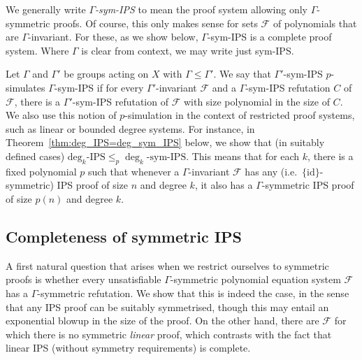 \documentclass[10pt,a4paper]{article}
\newcommand{\sIPS}{\mathrm{sym\text{-}IPS}}
\newcommand{\degKIPS}[1]{\mathrm{deg}_{#1}\mathrm{\text{-}IPS}}
\newcommand{\id}{\ensuremath{\mathrm{id}}}
\newcommand{\F}{\ensuremath{\mathcal{F}}}
\begin{document}
We generally write \emph{$\Gamma$-sym-IPS} to mean the proof system allowing only $\Gamma$-symmetric proofs.  Of course, this only makes sense for sets $\F$ of polynomials that are $\Gamma$-invariant.  For these, as we show below, $\Gamma$-sym-IPS is a complete proof system.  Where $\Gamma$ is clear from context, we may write just sym-IPS.

Let $\Gamma$ and $\Gamma'$ be groups acting on $X$ with $\Gamma \leq \Gamma'$.  We say that $\Gamma'$-sym-IPS $p$-simulates $\Gamma$-sym-IPS if for every $\Gamma'$-invariant $\F$ and a $\Gamma$-sym-IPS refutation $C$ of $\F$, there is a $\Gamma'$-sym-IPS refutation of $\F$ with size polynomial in the size of $C$.  We also use this notion of $p$-simulation in the context of restricted proof systems, such as linear or bounded degree systems.  For instance, in Theorem~\ref{thm:deg_IPS=deg_sym_IPS} below, we show that (in suitably defined cases) $\degKIPS{k}  \leq_p \deg_k\text{-}\sIPS$.  This means that for each $k$, there is a fixed polynomial $p$ such that whenever a $\Gamma$-invariant $\F$ has any (i.e.\ $\{\id\}$-symmetric) IPS proof of size $n$ and degree $k$, it also has a $\Gamma$-symmetric IPS proof of size $p(n)$ and degree $k$.


\subsection{Completeness of  symmetric IPS}

A first natural question that arises when we restrict ourselves to symmetric proofs is whether every unsatisfiable $\Gamma$-symmetric polynomial equation system $\F$ has a $\Gamma$-symmetric refutation.  We show that this is indeed the case, in the sense that any IPS proof can be suitably symmetrised, though this may entail an exponential blowup in the size of the proof. On the other hand, there are $\F$ for which there is no symmetric \emph{linear} proof, which contrasts with the fact that linear IPS (without symmetry requirements) is complete.
\end{document}
